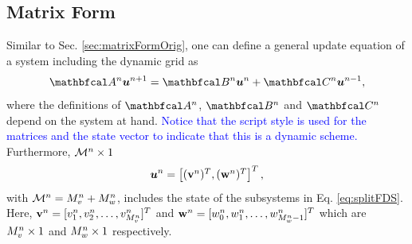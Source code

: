 \documentclass[fleqn]{jaes}
\def\SBcomment[#1]{\textcolor{red}{#1}}
\def\SWcomment[#1]{\textcolor{blue}{#1}}
\begin{document}
\subsection{Matrix Form}\label{sec:matrixForm}
Similar to Sec. \ref{sec:matrixFormOrig}, one can define a general update equation of a system including the dynamic grid as
\begin{equation}\label{eq:generalDynGridMatrix}
    \AA \uStack^{n+1} = \BB \uStack^n + \CC \uStack^{n-1},
\end{equation}
where the definitions of $\AA$, $\BB$ and $\CC$ depend on the system at hand. \SWcomment[Notice that the script style is used for the matrices and the state vector to indicate that this is a dynamic scheme.] Furthermore, ${\mathcal{M}^n} \times 1$%
\begin{equation}\label{eq:uStack}
    \uStack^n = \begin{bmatrix}
    (\v^n)^T, (\w^n)^T
    \end{bmatrix}^T,
\end{equation}
with ${\mathcal{M}^n} = M_v^n + M_w^n$, includes the state of the subsystems in Eq. \eqref{eq:splitFDS}. Here, $\mathbf{v}^n = [v_1^n, v_2^n, \hdots, v_{M_v^n}^n]^T$ and $\mathbf{w}^n = [w_0^n, w_1^n, \hdots, w_{M_w^n-1}^n]^T$ which are $M_v^n \times 1$ and $M_w^n \times 1$ respectively. 
\end{document}
